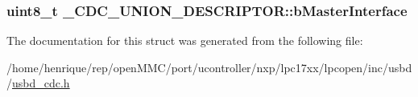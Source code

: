 \hypertarget{struct__CDC__UNION__DESCRIPTOR_aaa7e80367c520e1fc09a73f336df048e}{
\subsubsection[{b\-Master\-Interface}]{\setlength{\rightskip}{0pt plus 5cm}uint8\-\_\-t \-\_\-\-C\-D\-C\-\_\-\-U\-N\-I\-O\-N\-\_\-\-D\-E\-S\-C\-R\-I\-P\-T\-O\-R\-::b\-Master\-Interface}}\label{struct__CDC__UNION__DESCRIPTOR_aaa7e80367c520e1fc09a73f336df048e}


The documentation for this struct was generated from the following file\-:\begin{DoxyCompactItemize}
\item 
/home/henrique/rep/open\-M\-M\-C/port/ucontroller/nxp/lpc17xx/lpcopen/inc/usbd/\hyperlink{usbd__cdc_8h}{usbd\-\_\-cdc.\-h}\end{DoxyCompactItemize}
